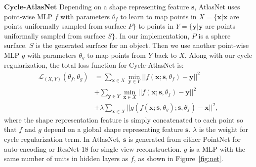 \noindent\textbf{Cycle-AtlasNet} Depending on a shape representing feature $\mathbf{s}$, AtlasNet uses point-wise MLP
$f$ with parameters $\theta_f$ to learn to map points in $X=\{\mathbf{x}| \mathbf{x}$ are points uniformally sampled from surface $P\}$ to points in $Y=\{\mathbf{y}| \mathbf{y}$ are points uniformally sampled from surface $S\}$. In our implementation, $P$ is a sphere surface. $S$ is the generated surface for an object. Then we use another point-wise MLP $g$ with parameters $\theta_g$ to map points from $Y$ back to $X$. Along with our cycle regularization, the total loss function for Cycle-AtlasNet is:
\begin{equation}
\begin{aligned}
\label{equ:atlascycle}
\mathcal{L}_{(X,Y)}(\theta_f,\theta_g) &= \sum_{\mathbf{x} \in X} \min_{\mathbf{y} \in Y}|| f(\mathbf{x};\mathbf{s},\theta_f) - \mathbf{y} ||^2 \\ &+ \sum_{ \mathbf{y} \in Y}\min_{ \mathbf{x} \in X} || f(\mathbf{x};\mathbf{s},\theta_f) - \mathbf{y} ||^2 \\ &+ \lambda\sum_{\mathbf{x} \in X}||g(f(\mathbf{x};\mathbf{s},\theta_g);\mathbf{s},\theta_f) - \mathbf{x}||^2,
\end{aligned}
 \end{equation}
where the shape representation feature is simply concatenated to each point so that $f$ and $g$ depend on a global shape representing feature $\mathbf{s}$. $\lambda$ is the weight for cycle regularization term. In AtlasNet, $\mathbf{s}$ is generated from either PointNet \cite{resnet} for auto-encoding or ResNet-18 \cite{resnet} for single view reconstruction. $g$ is a MLP with the same number of units in hidden layers as $f$, as shown in Figure~\ref{fig:net}.

